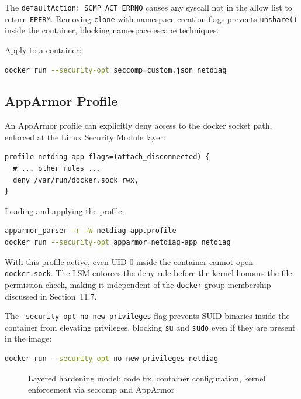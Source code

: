 The \texttt{defaultAction: SCMP\_ACT\_ERRNO} causes any syscall not in the allow list to return \texttt{EPERM}. Removing \texttt{clone} with namespace creation flags prevents \texttt{unshare()} inside the container, blocking namespace escape techniques.

Apply to a container:

\begin{lstlisting}[language=bash]
docker run --security-opt seccomp=custom.json netdiag
\end{lstlisting}

\subsection{AppArmor Profile}

An AppArmor profile can explicitly deny access to the docker socket path, enforced at the Linux Security Module layer:

\begin{lstlisting}
profile netdiag-app flags=(attach_disconnected) {
  # ... other rules ...
  deny /var/run/docker.sock rwx,
}
\end{lstlisting}

Loading and applying the profile:

\begin{lstlisting}[language=bash]
apparmor_parser -r -W netdiag-app.profile
docker run --security-opt apparmor=netdiag-app netdiag
\end{lstlisting}

With this profile active, even UID 0 inside the container cannot open \texttt{docker.sock}. The LSM enforces the deny rule before the kernel honours the file permission check, making it independent of the \texttt{docker} group membership discussed in Section~11.7.

The \texttt{--security-opt no-new-privileges} flag prevents SUID binaries inside the container from elevating privileges, blocking \texttt{su} and \texttt{sudo} even if they are present in the image:

\begin{lstlisting}[language=bash]
docker run --security-opt no-new-privileges netdiag
\end{lstlisting}

\begin{figure}[h]
\centering
\vspace{3cm}
\caption{Layered hardening model: code fix, container configuration, kernel enforcement via seccomp and AppArmor}
\end{figure}

